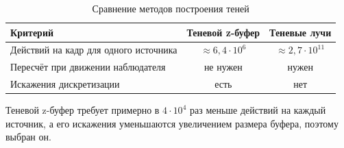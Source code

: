 \begin{table}[H]
	\caption{Сравнение методов построения теней}
	\label{tab:shadows}
	\begin{tabular}{|L{0.44}|C{0.27}|C{0.27}|}
		\hline
		Критерий & Теневой z-буфер & Теневые лучи \\
		\hline
		Действий на кадр для одного источника & $\approx 6{,}4 \cdot 10^{6}$ & $\approx 2{,}7 \cdot 10^{11}$ \\
		\hline
		Пересчёт при движении наблюдателя & не нужен & нужен \\
		\hline
		Искажения дискретизации & есть & нет \\
		\hline
	\end{tabular}
\end{table}

Теневой z-буфер требует примерно в $4 \cdot 10^4$ раз меньше действий на каждый источник, а его искажения уменьшаются увеличением размера буфера, поэтому выбран он.